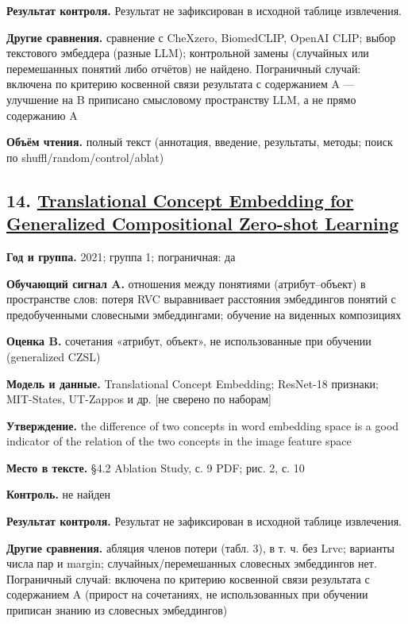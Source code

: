 \textbf{Результат контроля.} Результат не зафиксирован в исходной таблице извлечения.

\textbf{Другие сравнения.} сравнение с CheXzero, BiomedCLIP, OpenAI CLIP; выбор текстового эмбеддера (разные LLM); контрольной замены (случайных или перемешанных понятий либо отчётов) не найдено. Пограничный случай: включена по критерию косвенной связи результата с содержанием A — улучшение на B приписано смысловому пространству LLM, а не прямо содержанию A

\textbf{Объём чтения.} полный текст (аннотация, введение, результаты, методы; поиск по shuffl/random/control/ablat)


\subsection*{14. \href{https://doi.org/10.48550/arxiv.2112.10871}{Translational Concept Embedding for Generalized Compositional Zero-shot Learning}}

\textbf{Год и группа.} 2021; группа 1; пограничная: да

\textbf{Обучающий сигнал A.} отношения между понятиями (атрибут–объект) в пространстве слов: потеря RVC выравнивает расстояния эмбеддингов понятий с предобученными словесными эмбеддингами; обучение на виденных композициях

\textbf{Оценка B.} сочетания «атрибут, объект», не использованные при обучении (generalized CZSL)

\textbf{Модель и данные.} Translational Concept Embedding; ResNet-18 признаки; MIT-States, UT-Zappos и др. [не сверено по наборам]

\textbf{Утверждение.} the difference of two concepts in word embedding space is a good indicator of the relation of the two concepts in the image feature space

\textbf{Место в тексте.} §4.2 Ablation Study, с. 9 PDF; рис. 2, с. 10

\textbf{Контроль.} не найден

\textbf{Результат контроля.} Результат не зафиксирован в исходной таблице извлечения.

\textbf{Другие сравнения.} абляция членов потери (табл. 3), в т. ч. без Lrvc; варианты числа пар и margin; случайных/перемешанных словесных эмбеддингов нет. Пограничный случай: включена по критерию косвенной связи результата с содержанием A (прирост на сочетаниях, не использованных при обучении приписан знанию из словесных эмбеддингов)

